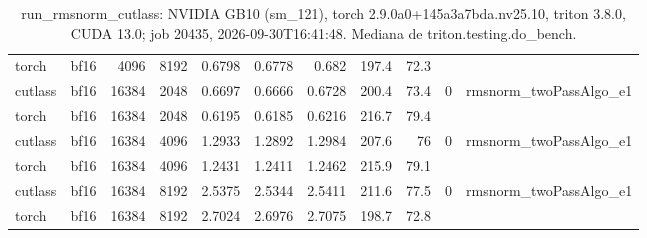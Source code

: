 \begin{table}[htbp]
\begin{tabular}{llrrrrrrrll}
    torch & bf16 & 4096 & 8192 & 0.6798 & 0.6778 & 0.682 & 197.4 & 72.3 &  &  \\
    cutlass & bf16 & 16384 & 2048 & 0.6697 & 0.6666 & 0.6728 & 200.4 & 73.4 & 0 & rmsnorm\_twoPassAlgo\_e1 \\
    torch & bf16 & 16384 & 2048 & 0.6195 & 0.6185 & 0.6216 & 216.7 & 79.4 &  &  \\
    cutlass & bf16 & 16384 & 4096 & 1.2933 & 1.2892 & 1.2984 & 207.6 & 76 & 0 & rmsnorm\_twoPassAlgo\_e1 \\
    torch & bf16 & 16384 & 4096 & 1.2431 & 1.2411 & 1.2462 & 215.9 & 79.1 &  &  \\
    cutlass & bf16 & 16384 & 8192 & 2.5375 & 2.5344 & 2.5411 & 211.6 & 77.5 & 0 & rmsnorm\_twoPassAlgo\_e1 \\
    torch & bf16 & 16384 & 8192 & 2.7024 & 2.6976 & 2.7075 & 198.7 & 72.8 &  &  \\
    \bottomrule
  \end{tabular}
  \caption{run\_rmsnorm\_cutlass: NVIDIA GB10 (sm\_121), torch 2.9.0a0+145a3a7bda.nv25.10, triton 3.8.0, CUDA 13.0; job 20435, 2026-09-30T16:41:48. Mediana de triton.testing.do\_bench.}
  \label{tab:run-rmsnorm-cutlass}
\end{table}
